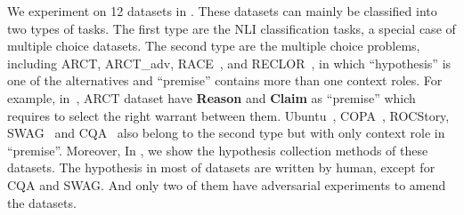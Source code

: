  We experiment on 12 datasets in . 
These datasets can mainly be classified into two types of tasks. 
The first type are the NLI classification tasks, a special case of multiple choice datasets. 
The second type are the multiple choice problems, including ARCT, 
ARCT\_adv\cite{schuster2019towards}, 
RACE~\cite{lai2017race}, and RECLOR~\cite{yu2020reclor}, in which ``hypothesis'' 
is one of the alternatives and ``premise'' contains more than one context roles. 
For example, in~, 
ARCT dataset have \textbf{Reason} and \textbf{Claim} as ``premise'' 
which requires to select the right warrant between them. 
Ubuntu~\cite{lowe2015ubuntu}, COPA~\cite{roemmele2011choice}, ROCStory, SWAG~\cite{zellers2018swag} and 
CQA~\cite{talmor2019commonsenseqa} also belong to the second type but with only context role 
in ``premise''.
Moreover, In , we 
show the hypothesis collection methods of these datasets. The hypothesis 
in most of datasets are written by human, except for CQA and SWAG. And only two of
them have adversarial experiments to amend the datasets.    
 
